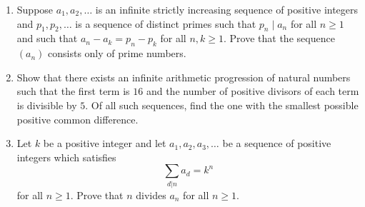 \documentclass[a4paper, 12pt]{article}
\newcommand{\solution}[1]{%
   \emph{Solution}: 
    #1            
}
\renewcommand{\solution}[1]{}
\begin{document}
\begin{enumerate}
    
\item Suppose $a_1,a_2, \dots$ is an infinite strictly increasing sequence of positive integers and $p_1, p_2, \dots$ is a sequence of distinct primes such that $p_n \mid a_n$ for all $n \geq 1$ and such that $a_n - a_k = p_n - p_k$ for all $n,k \geq 1$. Prove that the sequence $(a_n)$ consists only of prime numbers.

\solution{ Let $c = a_1 - p_1$, and assume for contradiction that $c \geq 1$. For all $n$, we have $a_n - p_n = a_1 - p_1 = c$. Now, as $p_n \mid a_n$, we have $p_n \mid (a_n - p_n) = c$, thus $p_n \leq c$. Hence $a_n = c + p_n \leq 2c$. This implies the sequence $(a_n)$ is bounded which is a contradiction. Thus $c = 0$, which implies $a_n = p_n$ for all $n$. \qed
}


\item Show that there exists an infinite arithmetic progression of natural numbers such that the first term is $16$ and the number of positive divisors of each term is divisible by $5$. Of all such sequences, find the one with the smallest possible positive common difference.

\solution{ Note that the sequence given by $a_k = 16 + 32k$ satisfies the problem condition, as $16 + 32k = 2^4 (2k + 1)$, thus $v_2(a_k) = 4$, which proves $4 + 1 = 5$ divides the number of divisors for all $k$.

Secondly, we note that the smallest possible common difference is 32, as the next smallest number after 16 that has number of divisors a multiple of 5 is $48 = 2^4 \cdot 3$. (indeed, if $n = p_1^{a_1} \dots p_k^{a_k}$, then $d(n) = (a_1 +1)\dots (a_k +1)$, which implies $5 \mid (a_i + 1)$ for some $i$. Thus, $a_i \geq 4$ for some $i$). \qed
}


\item Let $k$ be a positive integer and let $a_1, a_2, a_3, \dots$ be a sequence of positive integers which satisfies
\begin{equation*}
    \sum_{d|n} a_d = k^n 
\end{equation*}
for all $n \geq 1$. Prove that $n$ divides $a_n$ for all $n \geq 1$.


\end{enumerate}
\end{document}
